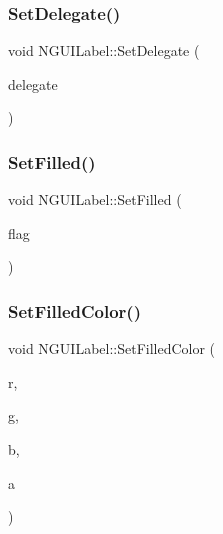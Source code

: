 \hypertarget{class_n_g_u_i_label_a254f7a5bf382d6d00a2f8af608dbca33}{}\label{class_n_g_u_i_label_a254f7a5bf382d6d00a2f8af608dbca33} 
\subsubsection{\texorpdfstring{Set\+Delegate()}{SetDelegate()}}
{\footnotesize\ttfamily void N\+G\+U\+I\+Label\+::\+Set\+Delegate (\begin{DoxyParamCaption}\item[{N\+G\+U\+I\+Label\+Delegate@}]{delegate }\end{DoxyParamCaption})}

\hypertarget{class_n_g_u_i_label_a041111bf18ec5dcd5d9af01116ef9afe}{}\label{class_n_g_u_i_label_a041111bf18ec5dcd5d9af01116ef9afe} 
\subsubsection{\texorpdfstring{Set\+Filled()}{SetFilled()}}
{\footnotesize\ttfamily void N\+G\+U\+I\+Label\+::\+Set\+Filled (\begin{DoxyParamCaption}\item[{bool}]{flag }\end{DoxyParamCaption})}

\hypertarget{class_n_g_u_i_label_aee309217d9d3c8190512eaa69b669854}{}\label{class_n_g_u_i_label_aee309217d9d3c8190512eaa69b669854} 
\subsubsection{\texorpdfstring{Set\+Filled\+Color()}{SetFilledColor()}\hspace{0.1cm}{\footnotesize\ttfamily [1/2]}}
{\footnotesize\ttfamily void N\+G\+U\+I\+Label\+::\+Set\+Filled\+Color (\begin{DoxyParamCaption}\item[{float}]{r,  }\item[{float}]{g,  }\item[{float}]{b,  }\item[{float}]{a }\end{DoxyParamCaption})}

